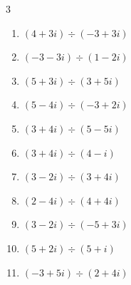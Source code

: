 \begin{multicols}{3}
\begin{enumerate}

  \item $\displaystyle (4+3i)\div(-3+3i)$


  \item $\displaystyle (-3-3i)\div(1-2i)$


  \item $\displaystyle (5+3i)\div(3+5i)$


  \item $\displaystyle (5-4i)\div(-3+2i)$


  \item $\displaystyle (3+4i)\div(5-5i)$


\columnbreak %

\resetques

  \item $\displaystyle (3+4i)\div(4-i)$


  \item $\displaystyle (3-2i)\div(3+4i)$


  \item $\displaystyle (2-4i)\div(4+4i)$


  \item $\displaystyle (3-2i)\div(-5+3i)$


  \item $\displaystyle (5+2i)\div(5+i)$


  \item $\displaystyle (-3+5i)\div(2+4i)$



\end{enumerate}
\end{multicols}
